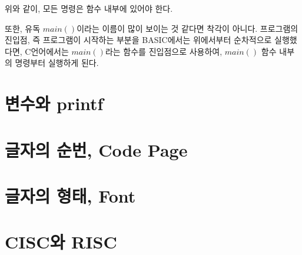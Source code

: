 \documentclass{article}
\begin{document}
위와 같이, 모든 명령은 함수 내부에 있어야 한다.

또한, 유독 $main()$이라는 이름이 많이 보이는 것 같다면 착각이 아니다.
프로그램의 진입점, 즉 프로그램이 시작하는 부분을 BASIC에서는 위에서부터 순차적으로 실행했다면,
C언어에서는 $main()$라는 함수를 진입점으로 사용하여, $main()$ 함수 내부의 명령부터 실행하게 된다.

\section{변수와 printf}

\appendix

\section{글자의 순번, Code Page}
\label{sec:code-page}

\section{글자의 형태, Font}
\label{sec:fonts}

\section{CISC와 RISC}
\label{sec:cisc-risc}
\end{document}
